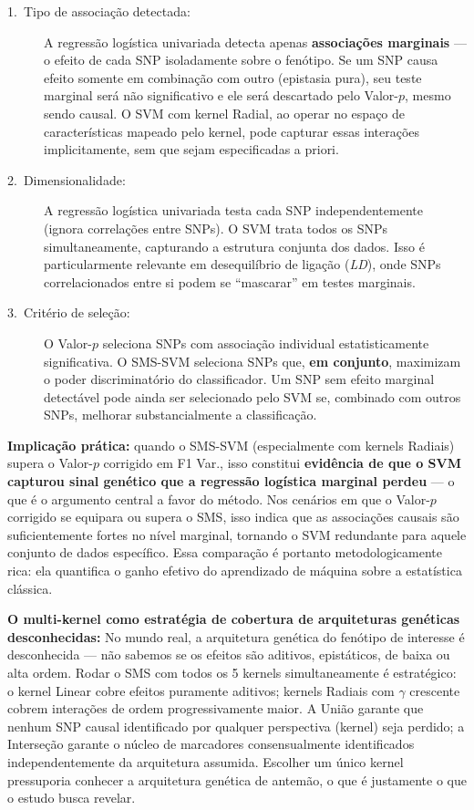 \documentclass[12pt,a4paper]{article}
\newcommand{\novo}[1]{\textcolor{corNova}{#1}}
\begin{document}
\begin{description}
  \item[\novo{1.\ Tipo de associação detectada:}]
  \novo{A regressão logística univariada detecta apenas \textbf{associações marginais} --- o efeito de cada SNP isoladamente sobre o fenótipo. Se um SNP causa efeito somente em combinação com outro (epistasia pura), seu teste marginal será não significativo e ele será descartado pelo Valor-$p$, mesmo sendo causal. O SVM com kernel Radial, ao operar no espaço de características mapeado pelo kernel, pode capturar essas interações implicitamente, sem que sejam especificadas a priori.}

  \item[\novo{2.\ Dimensionalidade:}]
  \novo{A regressão logística univariada testa cada SNP independentemente (ignora correlações entre SNPs). O SVM trata todos os SNPs simultaneamente, capturando a estrutura conjunta dos dados. Isso é particularmente relevante em desequilíbrio de ligação (\textit{LD}), onde SNPs correlacionados entre si podem se ``mascarar'' em testes marginais.}

  \item[\novo{3.\ Critério de seleção:}]
  \novo{O Valor-$p$ seleciona SNPs com associação individual estatisticamente significativa. O SMS-SVM seleciona SNPs que, \textbf{em conjunto}, maximizam o poder discriminatório do classificador. Um SNP sem efeito marginal detectável pode ainda ser selecionado pelo SVM se, combinado com outros SNPs, melhorar substancialmente a classificação.}
\end{description}

\novo{\textbf{Implicação prática:} quando o SMS-SVM (especialmente com kernels Radiais) supera o Valor-$p$ corrigido em F1 Var., isso constitui \textbf{evidência de que o SVM capturou sinal genético que a regressão logística marginal perdeu} --- o que é o argumento central a favor do método. Nos cenários em que o Valor-$p$ corrigido se equipara ou supera o SMS, isso indica que as associações causais são suficientemente fortes no nível marginal, tornando o SVM redundante para aquele conjunto de dados específico. Essa comparação é portanto metodologicamente rica: ela quantifica o ganho efetivo do aprendizado de máquina sobre a estatística clássica.}

\novo{\textbf{O multi-kernel como estratégia de cobertura de arquiteturas genéticas desconhecidas:} No mundo real, a arquitetura genética do fenótipo de interesse é desconhecida --- não sabemos se os efeitos são aditivos, epistáticos, de baixa ou alta ordem. Rodar o SMS com todos os 5 kernels simultaneamente é estratégico: o kernel Linear cobre efeitos puramente aditivos; kernels Radiais com $\gamma$ crescente cobrem interações de ordem progressivamente maior. A União garante que nenhum SNP causal identificado por qualquer perspectiva (kernel) seja perdido; a Interseção garante o núcleo de marcadores consensualmente identificados independentemente da arquitetura assumida. Escolher um único kernel pressuporia conhecer a arquitetura genética de antemão, o que é justamente o que o estudo busca revelar.}
\end{document}

